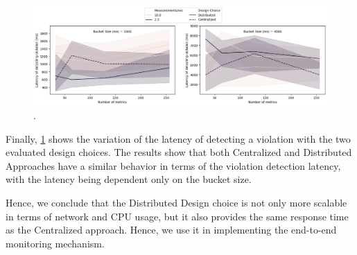 \begin{figure}
\centering
\includegraphics[width=\linewidth]{figures/design_space/monitoring/response_time.png}
\caption{.}
\label{fig:monitoring_response_time}
\end{figure}
Finally, \cref{fig:monitoring_response_time} shows the variation of the latency of detecting a violation with the two evaluated design choices. The results show that both Centralized and Distributed Approaches have a similar behavior in terms of the violation detection latency, with the latency being dependent only on the bucket size. 
\par Hence, we conclude that the Distributed Design choice is not only more scalable in terms of network and CPU usage, but it also provides the same response time as the Centralized approach. Hence, we use it in implementing the end-to-end monitoring mechanism.